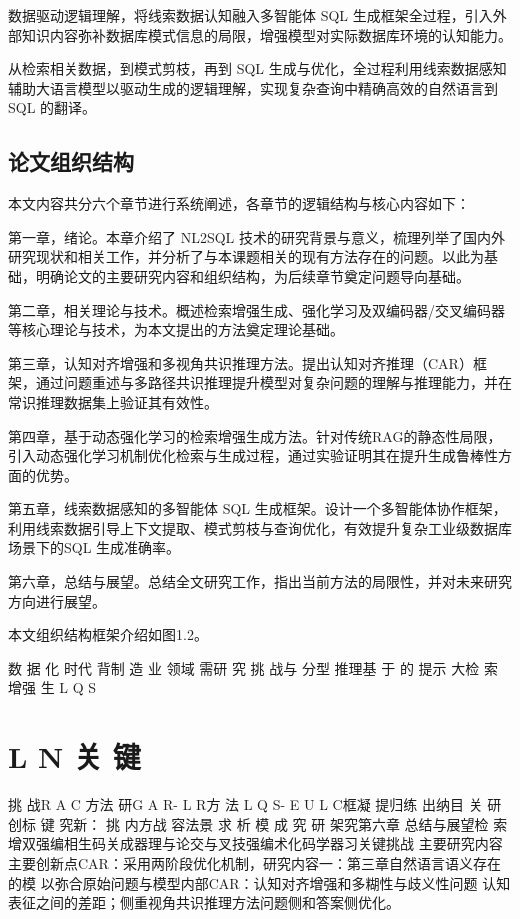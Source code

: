 \documentclass[12pt,a4paper,openright,UTF8]{ctexbook}
\begin{document}
数据驱动逻辑理解，将线索数据认知融入多智能体 SQL 生成框架全过程，引入外部知识内容弥补数据库模式信息的局限，增强模型对实际数据库环境的认知能力。


从检索相关数据，到模式剪枝，再到 SQL 生成与优化，全过程利用线索数据感知辅助大语言模型以驱动生成的逻辑理解，实现复杂查询中精确高效的自然语言到SQL 的翻译。

\section{论文组织结构}

本文内容共分六个章节进行系统阐述，各章节的逻辑结构与核心内容如下：


第一章，绪论。本章介绍了 NL2SQL 技术的研究背景与意义，梳理列举了国内外研究现状和相关工作，并分析了与本课题相关的现有方法存在的问题。以此为基础，明确论文的主要研究内容和组织结构，为后续章节奠定问题导向基础。


第二章，相关理论与技术。概述检索增强生成、强化学习及双编码器/交叉编码器等核心理论与技术，为本文提出的方法奠定理论基础。


第三章，认知对齐增强和多视角共识推理方法。提出认知对齐推理（CAR）框架，通过问题重述与多路径共识推理提升模型对复杂问题的理解与推理能力，并在常识推理数据集上验证其有效性。


第四章，基于动态强化学习的检索增强生成方法。针对传统RAG的静态性局限，引入动态强化学习机制优化检索与生成过程，通过实验证明其在提升生成鲁棒性方面的优势。


第五章，线索数据感知的多智能体 SQL 生成框架。设计一个多智能体协作框架，利用线索数据引导上下文提取、模式剪枝与查询优化，有效提升复杂工业级数据库场景下的SQL 生成准确率。


第六章，总结与展望。总结全文研究工作，指出当前方法的局限性，并对未来研究方向进行展望。


本文组织结构框架介绍如图1.2。


数 据 化 时代 背制 造 业 领域 需研 究 挑 战与 分型 推理基 于 的 提示 大检 索 增强 生 L Q S

\chapter{L N 关 键}

挑 战R A C 方法 研G A R- L R方 法 L Q S- E U L C框凝 提归练 出纳目 关 研创标 键 究新： 挑 内方战 容法景 求 析 模 成 究 研 架究第六章 总结与展望检 索 增双强编相生码关成器理与论交与叉技强编术化码学器习关键挑战 主要研究内容 主要创新点CAR：采用两阶段优化机制，研究内容一：第三章自然语言语义存在的模 以弥合原始问题与模型内部CAR：认知对齐增强和多糊性与歧义性问题 认知表征之间的差距；侧重视角共识推理方法问题侧和答案侧优化。
\end{document}
